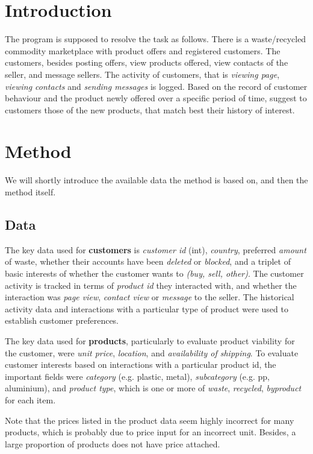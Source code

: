 \documentclass{report}
\begin{document}
\section*{Introduction}

The program is supposed to resolve the task as follows. There is a waste/recycled commodity marketplace with
product offers and registered customers. The customers, besides posting offers, view products offered, view
contacts of the seller, and message sellers. The activity of customers, that is \emph{viewing page}, 
\emph{viewing contacts} and \emph{sending messages} is logged. Based on the record of customer behaviour and 
the product newly offered over a specific period of time, suggest to customers those of the new products, that 
match best their history of interest.

\section*{Method}

We will shortly introduce the available data the method is based on, and then the method itself.

\subsection*{Data}

The key data used for \textbf{customers} is \emph{customer id} (int), \emph{country}, preferred \emph{amount}
of waste, whether their accounts have been \emph{deleted} or \emph{blocked}, and a triplet of basic interests of
whether the customer wants to \emph{(buy, sell, other)}. The customer activity is tracked in terms of 
\emph{product id} they interacted with, and whether the interaction was \emph{page view}, \emph{contact view}
or \emph{message} to the seller. The historical activity data and interactions with a particular type of product
were used to establish customer preferences.

The key data used for \textbf{products}, particularly to evaluate product viability for the customer, were \emph{unit price},
\emph{location}, and \emph{availability of shipping}. To evaluate customer interests based on interactions with a 
particular product id, the important fields were \emph{category} (e.g. plastic, metal), \emph{subcategory} (e.g.
pp, aluminium), and \emph{product type}, which is one or more of \emph{waste}, \emph{recycled}, \emph{byproduct} for
each item.

Note that the prices listed in the product data seem highly incorrect for many products, which is probably due to 
price input for an incorrect unit. Besides, a large proportion of products does not have price attached.
\end{document}
